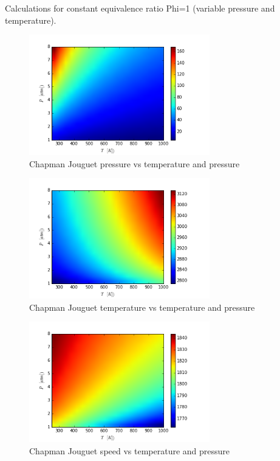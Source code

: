\documentclass[11pt,a4paper]{article}
\begin{document}
Calculations for constant equivalence ratio Phi=1 (variable pressure and temperature).\\
\begin{figure}[h]
    \centering
    \includegraphics[width=0.7\textwidth]{CJ_P_T_P_}
    \caption{Chapman Jouguet pressure vs temperature and pressure}
    \label{fig:I}
\end{figure}
\clearpage
\begin{figure}[h]
    \centering
    \includegraphics[width=0.7\textwidth]{CJ_T_T_P_}
    \caption{Chapman Jouguet temperature vs temperature and pressure}
    \label{fig:J}
\end{figure}

\begin{figure}[h]
    \centering
    \includegraphics[width=0.7\textwidth]{CJ_V_T_P_}
    \caption{Chapman Jouguet speed vs temperature and pressure}
    \label{fig:K}
\end{figure}
\end{document}
